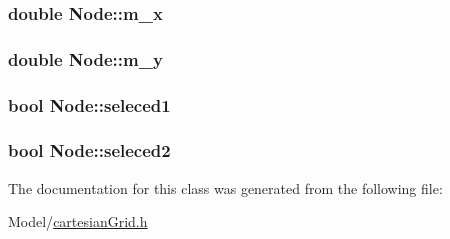 \hypertarget{class_node_a4ffb0b48da3355f3600142d3bfff9516}{
\subsubsection[{m\+\_\+x}]{\setlength{\rightskip}{0pt plus 5cm}double Node\+::m\+\_\+x}}\label{class_node_a4ffb0b48da3355f3600142d3bfff9516}
\hypertarget{class_node_a380511589123d85c8d759c682abcb6de}{
\subsubsection[{m\+\_\+y}]{\setlength{\rightskip}{0pt plus 5cm}double Node\+::m\+\_\+y}}\label{class_node_a380511589123d85c8d759c682abcb6de}
\hypertarget{class_node_abf67558672f9f1a459612a66ebe0d3e3}{
\subsubsection[{seleced1}]{\setlength{\rightskip}{0pt plus 5cm}bool Node\+::seleced1}}\label{class_node_abf67558672f9f1a459612a66ebe0d3e3}
\hypertarget{class_node_a9f83516dc28d2b4f894b466290b99d5f}{
\subsubsection[{seleced2}]{\setlength{\rightskip}{0pt plus 5cm}bool Node\+::seleced2}}\label{class_node_a9f83516dc28d2b4f894b466290b99d5f}


The documentation for this class was generated from the following file\+:\begin{DoxyCompactItemize}
\item 
Model/\hyperlink{cartesian_grid_8h}{cartesian\+Grid.\+h}\end{DoxyCompactItemize}
